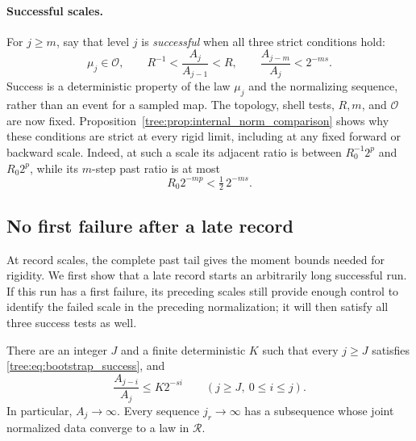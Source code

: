 \paragraph{Successful scales.}
For $j\geq m$, say that level $j$ is \emph{successful} when
all three strict conditions hold:
\begin{equation}
 \mu_j\in\mathcal O,\qquad
 R^{-1}<\frac{A_j}{A_{j-1}}<R,\qquad
 \frac{A_{j-m}}{A_j}<2^{-ms}.
 \label{tree:eq:bootstrap_success}
\end{equation}
Success is a deterministic property of the law $\mu_j$ and the
normalizing sequence, rather than an event for a sampled map.
The topology, shell tests, $R,m$, and $\mathcal O$ are now fixed.
Proposition~\ref{tree:prop:internal_norm_comparison}
shows why these conditions are strict at every rigid limit,
including at any fixed forward or backward scale.  Indeed, at
such a scale its adjacent ratio is between
$R_0^{-1}2^p$ and $R_0 2^p$, while its $m$-step past ratio
is at most
\begin{equation}
 R_0 2^{-mp}<\tfrac12\,2^{-ms}.
 \label{tree:eq:bootstrap_strict_improvement}
\end{equation}

\subsection{No first failure after a late record}

At record scales, the complete past tail gives the moment bounds
needed for rigidity.  We first show that a late record starts an
arbitrarily long successful run.  If this run has a first failure,
its preceding scales still provide enough control to identify the
failed scale in the preceding normalization; it will then satisfy
all three success tests as well.

\begin{proposition}
\label{tree:prop:bootstrap}
There are an integer $J$ and a finite deterministic $K$ such
that every $j\geq J$ satisfies \eqref{tree:eq:bootstrap_success},
and
\begin{equation}
 \frac{A_{j-i}}{A_j}\leq K2^{-si}
 \qquad(j\geq J,\ 0\leq i\leq j).
 \label{tree:eq:bootstrap_allscale_bound}
\end{equation}
In particular, $A_j\to\infty$.  Every sequence $j_r\to\infty$
has a subsequence whose joint normalized data converge to a
law in $\mathcal R$.
\end{proposition}

